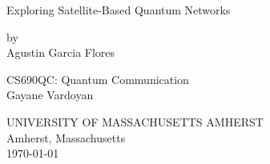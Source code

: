 \documentclass[openany]{book}
\begin{document}
\begin{titlepage}
\begin{center}

\vspace*{2cm}

{\huge Exploring Satellite-Based Quantum Networks}

\vspace{2cm}

{\large by\\Agustin Garcia Flores}

\vspace{2cm}

{CS690QC: Quantum Communication\\ Gayane Vardoyan}

\vfill

\vspace*{3cm}

UNIVERSITY OF MASSACHUSETTS AMHERST\\
Amherst, Massachusetts\\
\today
\end{center}
\end{titlepage}

\tableofcontents
\newpage






\end{document}
